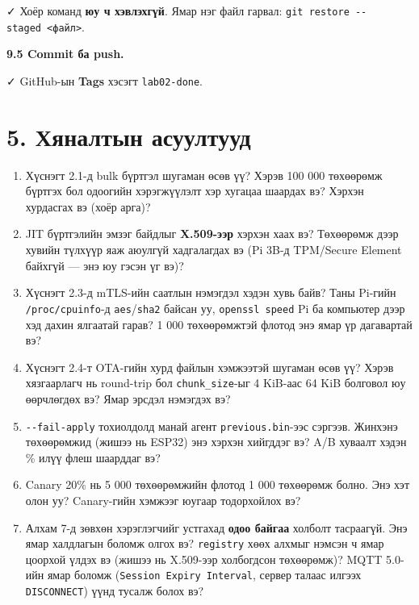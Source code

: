 ✓ Хоёр команд \textbf{юу ч хэвлэхгүй}. Ямар нэг файл гарвал: \texttt{git\ restore\ -\/\allowbreak{}-staged\ \textless{}файл\textgreater{}}.

\textbf{9.5 Commit ба push.}

\begin{Shaded}
\begin{Highlighting}[]
\KeywordTok{\&\&} 
\end{Highlighting}
\end{Shaded}

✓ GitHub-ын \textbf{Tags} хэсэгт \texttt{lab02-done}.

\hypertarget{ux445ux44fux43dux430ux43bux442ux44bux43d-ux430ux441ux443ux443ux43bux442ux443ux443ux434}{%
\section{5. Хяналтын асуултууд}\label{ux445ux44fux43dux430ux43bux442ux44bux43d-ux430ux441ux443ux443ux43bux442ux443ux443ux434}}

\begin{enumerate}
\def\labelenumi{\arabic{enumi}.}
\item
  Хүснэгт 2.1-д bulk бүртгэл шугаман өсөв үү? Хэрэв 100 000 төхөөрөмж бүртгэх бол одоогийн хэрэгжүүлэлт хэр хугацаа шаардах вэ? Хэрхэн хурдасгах вэ (хоёр арга)?
\item
  JIT бүртгэлийн эмзэг байдлыг \textbf{X.509-ээр} хэрхэн хаах вэ? Төхөөрөмж дээр хувийн түлхүүр яаж аюулгүй хадгалагдах вэ (Pi 3B-д TPM/Secure Element байхгүй --- энэ юу гэсэн үг вэ)?
\item
  Хүснэгт 2.3-д mTLS-ийн саатлын нэмэгдэл хэдэн хувь байв? Таны Pi-гийн \texttt{/proc/cpuinfo}-д \texttt{aes}/\allowbreak\texttt{sha2} байсан уу, \texttt{openssl\ speed} Pi ба компьютер дээр хэд дахин ялгаатай гарав? 1 000 төхөөрөмжтэй флотод энэ ямар үр дагавартай вэ?
\item
  Хүснэгт 2.4-т OTA-гийн хурд файлын хэмжээтэй шугаман өсөв үү? Хэрэв хязгаарлагч нь round-trip бол \texttt{chunk\_size}-ыг 4 KiB-аас 64 KiB болговол юу өөрчлөгдөх вэ? Ямар эрсдэл нэмэгдэх вэ?
\item
  \texttt{-\/-fail-apply} тохиолдолд манай агент \texttt{previous.bin}-ээс сэргээв. Жинхэнэ төхөөрөмжид (жишээ нь ESP32) энэ хэрхэн хийгддэг вэ? A/B хуваалт хэдэн \% илүү флеш шаарддаг вэ?
\item
  Canary 20\% нь 5 000 төхөөрөмжийн флотод 1 000 төхөөрөмж болно. Энэ хэт олон уу? Canary-гийн хэмжээг юугаар тодорхойлох вэ?
\item
  Алхам 7-д зөвхөн хэрэглэгчийг устгахад \textbf{одоо байгаа} холболт тасраагүй. Энэ ямар халдлагын боломж олгох вэ? \texttt{registry} хөөх алхмыг нэмсэн ч ямар цоорхой үлдэх вэ (жишээ нь X.509-ээр холбогдсон төхөөрөмж)? MQTT 5.0-ийн ямар боломж (\texttt{Session\ Expiry\ Interval}, сервер талаас илгээх \texttt{DISCONNECT}) үүнд тусалж болох вэ?
\end{enumerate}

